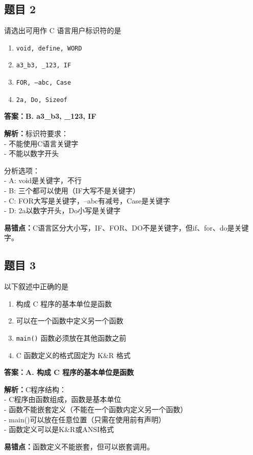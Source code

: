 \documentclass[12pt,a4paper]{ctexart}
\begin{document}
\subsection*{题目 2}
请选出可用作 C 语言用户标识符的是
\begin{enumerate}[label=\Alph*.]
	\item \texttt{void, define, WORD}
	\item \texttt{a3\_b3, \_123, IF}
	\item \texttt{FOR, --abc, Case}
	\item \texttt{2a, Do, Sizeof}
\end{enumerate}

\begin{answerbox}
	\textbf{答案：B. a3\_b3, \_123, IF}

	\textbf{解析：}标识符要求：\\
	- 不能使用C语言关键字\\
	- 不能以数字开头

	分析选项：\\
	- A: void是关键字，不行\\
	- B: 三个都可以使用（IF大写不是关键字）\\
	- C: FOR大写是关键字，--abc有减号，Case是关键字\\
	- D: 2a以数字开头，Do小写是关键字

	\textbf{易错点：}C语言区分大小写，IF、FOR、DO不是关键字，但if、for、do是关键字。
\end{answerbox}

\subsection*{题目 3}
以下叙述中正确的是
\begin{enumerate}[label=\Alph*.]
	\item 构成 C 程序的基本单位是函数
	\item 可以在一个函数中定义另一个函数
	\item \texttt{main()} 函数必须放在其他函数之前
	\item C 函数定义的格式固定为 K\&R 格式
\end{enumerate}

\begin{answerbox}
	\textbf{答案：A. 构成 C 程序的基本单位是函数}

	\textbf{解析：}C程序结构：\\
	- C程序由函数组成，函数是基本单位\\
	- 函数不能嵌套定义（不能在一个函数内定义另一个函数）\\
	- main()可以放在任意位置（只需在使用前有声明）\\
	- 函数定义可以是K\&R或ANSI格式

	\textbf{易错点：}函数定义不能嵌套，但可以嵌套调用。
\end{answerbox}
\end{document}

